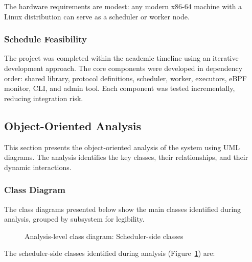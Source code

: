 The hardware requirements are modest: any modern x86-64 machine with a Linux distribution can serve as a scheduler or worker node.

\subsubsection{Schedule Feasibility}

The project was completed within the academic timeline using an iterative development approach. The core components were developed in dependency order: shared library, protocol definitions, scheduler, worker, executors, eBPF monitor, CLI, and admin tool. Each component was tested incrementally, reducing integration risk.

\subsection{Object-Oriented Analysis}

This section presents the object-oriented analysis of the system using UML diagrams. The analysis identifies the key classes, their relationships, and their dynamic interactions.

\subsubsection{Class Diagram}

The class diagrams presented below show the main classes identified during analysis, grouped by subsystem for legibility.

\begin{figure}[htbp]
	\centering
	\caption{Analysis-level class diagram: Scheduler-side classes}
	\label{fig:class-analysis-scheduler}
\end{figure}

The scheduler-side classes identified during analysis (Figure~\ref{fig:class-analysis-scheduler}) are:

